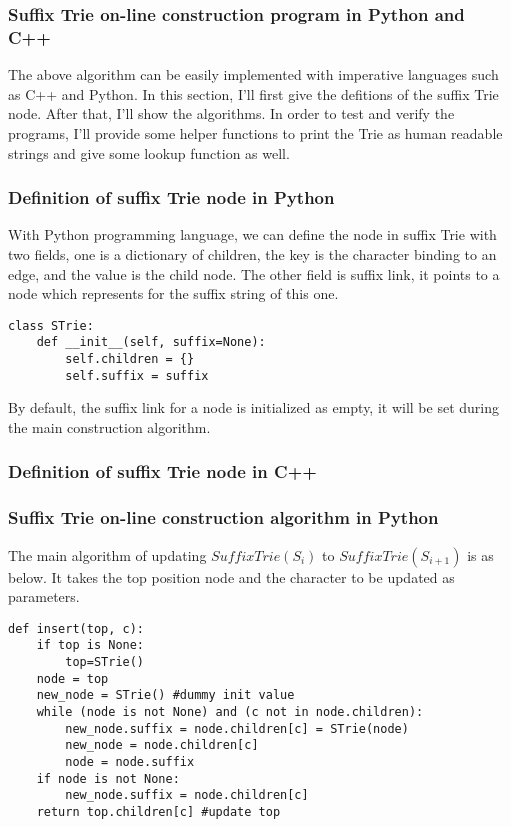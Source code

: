 \documentclass{article}
\begin{document}
\subsubsection{Suffix Trie on-line construction program in Python and C++}
The above algorithm can be easily implemented with imperative languages such as C++ and Python.
In this section, I'll first give the defitions of the suffix Trie node. After that, I'll
show the algorithms. In order to test and verify the programs, I'll provide some helper
functions to print the Trie as human readable strings and give some lookup function as well.

\subsubsection*{Definition of suffix Trie node in Python}
With Python programming language, we can define the node in suffix Trie with two fields, one
is a dictionary of children, the key is the character binding to an edge, and the value
is the child node. The other field is suffix link, it points to a node which represents for
the suffix string of this one.

\lstset{language=Python}
\begin{lstlisting}
class STrie:
    def __init__(self, suffix=None):
        self.children = {}
        self.suffix = suffix
\end{lstlisting}

By default, the suffix link for a node is initialized as empty, it will be set during the 
main construction algorithm.

\subsubsection*{Definition of suffix Trie node in C++}

\subsubsection*{Suffix Trie on-line construction algorithm in Python}
The main algorithm of updating $SuffixTrie(S_i)$ to $SuffixTrie(S_{i+1})$ is as below.
It takes the top position node and the character to be updated as parameters.

\lstset{language=Python}
\begin{lstlisting}
def insert(top, c):
    if top is None:
        top=STrie()
    node = top
    new_node = STrie() #dummy init value
    while (node is not None) and (c not in node.children):
        new_node.suffix = node.children[c] = STrie(node)
        new_node = node.children[c]
        node = node.suffix
    if node is not None:
        new_node.suffix = node.children[c]
    return top.children[c] #update top
\end{lstlisting}
\end{document}
